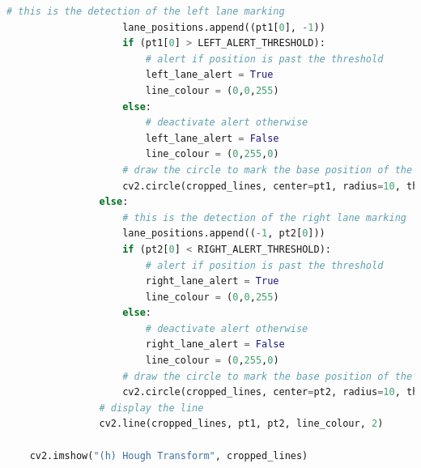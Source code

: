 \documentclass[10pt,conference]{IEEEtran}
\begin{document}
\begin{lstlisting}[language=Python,basicstyle=\tiny, showspaces=false, showstringspaces=false tabsize=1, breaklines=true]
                    # this is the detection of the left lane marking
                    lane_positions.append((pt1[0], -1))
                    if (pt1[0] > LEFT_ALERT_THRESHOLD):
                        # alert if position is past the threshold
                        left_lane_alert = True
                        line_colour = (0,0,255)
                    else:
                        # deactivate alert otherwise
                        left_lane_alert = False
                        line_colour = (0,255,0)
                    # draw the circle to mark the base position of the lane marking
                    cv2.circle(cropped_lines, center=pt1, radius=10, thickness=2, color=line_colour)
                else:
                    # this is the detection of the right lane marking
                    lane_positions.append((-1, pt2[0]))
                    if (pt2[0] < RIGHT_ALERT_THRESHOLD):
                        # alert if position is past the threshold
                        right_lane_alert = True
                        line_colour = (0,0,255)
                    else:
                        # deactivate alert otherwise
                        right_lane_alert = False
                        line_colour = (0,255,0)
                    # draw the circle to mark the base position of the lane marking
                    cv2.circle(cropped_lines, center=pt2, radius=10, thickness=2, color=line_colour)
                # display the line
                cv2.line(cropped_lines, pt1, pt2, line_colour, 2)

    cv2.imshow("(h) Hough Transform", cropped_lines)


\end{lstlisting}
\end{document}
